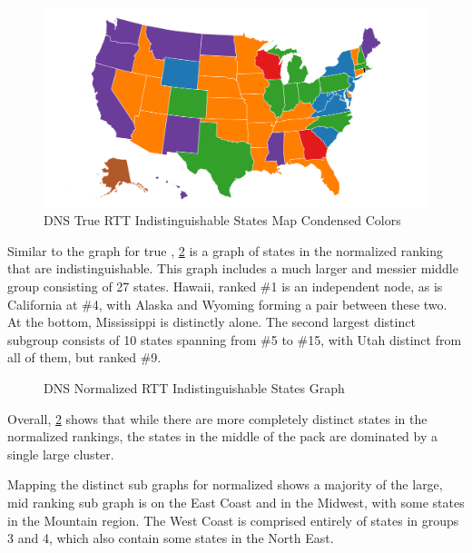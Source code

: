 \begin{figure}[H]
    \centering
    \includegraphics{images/dns/analysis_no_auth_agg/rtt/no_auth_distinct_rtt_map_condensed.png}
    \caption{DNS True RTT Indistinguishable States Map Condensed Colors}
    \label{fig:dns_true_rtt_indistinguishable_states_map_condensed_colors}
\end{figure}

Similar to the graph for true \rtt, \cref{fig:dns_normalized_rtt_indistinguishable_states_graph} is a graph of states in the normalized \rtt ranking that are indistinguishable. This graph includes a much larger and messier middle group consisting of 27 states. Hawaii, ranked \#1 is an independent node, as is California at \#4, with Alaska and Wyoming forming a pair between these two. At the bottom, Mississippi is distinctly alone. The second largest distinct subgroup consists of 10 states spanning from \#5 to \#15, with Utah distinct from all of them, but ranked \#9.

\begin{figure}[H]
    \centering
    
    \caption{DNS Normalized RTT Indistinguishable States Graph}
    \label{fig:dns_normalized_rtt_indistinguishable_states_graph}
\end{figure}

Overall, \cref{fig:dns_normalized_rtt_indistinguishable_states_graph} shows that while there are more completely distinct states in the normalized rankings, the states in the middle of the pack are dominated by a single large cluster.

Mapping the distinct sub graphs for normalized \dns \rtt shows a majority of the large, mid ranking sub graph is on the East Coast and in the Midwest, with some states in the Mountain region. The West Coast is comprised entirely of states in groups 3 and 4, which also contain some states in the North East.

